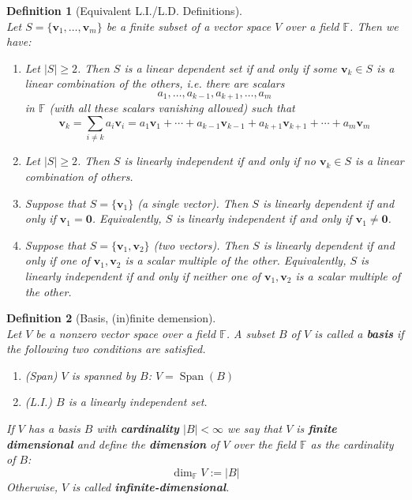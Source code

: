 \documentclass[12pt]{article}
\newtheorem{definition}{Definition}[section]
\theoremstyle{definition}
\DeclareMathOperator{\spn}{Span}
\begin{document}
\begin{definition}[Equivalent L.I./L.D. Definitions]
\hfill\\
\normalfont Let $S=\{\mathbf{v}_1,\ldots,\mathbf{v}_m\}$ be a finite subset of a vector space $V$ over a field $\mathbb{F}$. Then we have:
\begin{enumerate}[label=(\arabic*)]
\item Let $|S|\geq 2$. Then $S$ is a linear dependent set if and only if some $\mathbf{v}_k\in S$ is a linear combination of the others, i.e. there are scalars
\[
a_1,\ldots,a_{k-1},a_{k+1},\ldots,a_m
\]
in $\mathbb{F}$ (with all these scalars vanishing allowed) such that
\[
\mathbf{v}_k=\sum_{i\neq k}a_i\mathbf{v}_i=a_1\mathbf{v}_1+\cdots+a_{k-1}\mathbf{v}_{k-1}+a_{k+1}\mathbf{v}_{k+1}+\cdots+a_m\mathbf{v}_m
\]
\item Let $|S|\geq 2$. Then $S$ is linearly independent if and only if no $\mathbf{v}_k\in S$ is a linear combination of others.
\item Suppose that $S=\{\mathbf{v}_1\}$ (a single vector). Then $S$ is linearly dependent if and only if $\mathbf{v}_1=\mathbf{0}$. Equivalently, $S$ is linearly independent if and only if $\mathbf{v}_1\neq \mathbf{0}$.
\item Suppose that $S=\{\mathbf{v}_1,\mathbf{v}_2\}$ (two vectors). Then $S$ is linearly dependent if and only if one of $\mathbf{v}_1,\mathbf{v}_2$ is a scalar multiple of the other. Equivalently, $S$ is linearly independent if and only if neither one of $\mathbf{v}_1,\mathbf{v}_2$ is a scalar multiple of the other. 
\end{enumerate}
\end{definition}
\begin{definition}[Basis, (in)finite demension]
\hfill\\\normalfont Let $V$ be a nonzero vector space over a field $\mathbb{F}$. A subset $B$ of $V$ is called a \textbf{basis} if the following two conditions are satisfied.
\begin{enumerate}[label=(\arabic*)]
\item (Span) $V$ is spanned by $B$: $V=\spn(B)$
\item (L.I.) $B$ is a linearly independent set.
\end{enumerate}
If $V$ has a basis $B$ with \textbf{cardinality} $|B|<\infty$ we say that $V$ is \textbf{finite dimensional} and define the \textbf{dimension} of $V$ over the field $\mathbb{F}$ as the cardinality of $B$:
\[
\dim_\mathbb{F}V:=|B|
\]
Otherwise, $V$ is called \textbf{infinite-dimensional}.
\end{definition}
\end{document}
